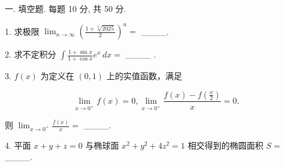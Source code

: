\documentclass{examcollection}
\renewcommand{\displayformula}[1]{\[#1\]}
\begin{document}
{\begin{minipage}{\textwidth}
\smallskip
一. 填空题. 每题 10 分, 共 50 分.\par
1. 求极限  $\lim_{n\to\infty}\left(\frac{1+\sqrt[n]{2025}}{2}\right)^n=$  \_\_\_\_.\par
2. 求不定积分  $\int \frac{1 + \sin x}{1 + \cos x} e^{x} \, dx =$ \_\_\_\_ .\par
3. $f(x)$ 为定义在 $(0,1)$ 上的实值函数，满足\par
\displayformula{\lim _ {x \rightarrow 0 ^ {+}} f (x) = 0, \lim _ {x \rightarrow 0 ^ {+}} \frac {f (x) - f \left(\frac {x}{2}\right)}{x} = 0.}\par
则  $\lim_{x\to0^{+}}\frac{f(x)}{x}=$  \_\_\_\_.\par
4. 平面 $x + y + z = 0$ 与椭球面 $x^{2} + y^{2} + 4z^{2} = 1$ 相交得到的椭圆面积 $S =$ \_\_\_\_.\par
\end{minipage}}
\ifdim\dimexpr\ht\proofbox+\dp\proofbox\relax>\textheight
\noindent\resizebox{!}{\textheight}{\usebox{\proofbox}}\else\noindent\usebox{\proofbox}\fi\clearpage
\end{document}

